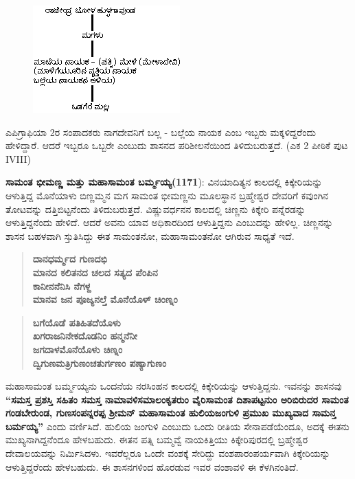 \begin{figure}[H]
\includegraphics[scale=.75]{images/chap3/chap3fig4.2.jpeg}
\end{figure}

ಎಪಿಗ್ರಾಫಿಯಾ 2ರ ಸಂಪಾದಕರು ನಾಗದೇವನಿಗೆ ಬಲ್ಲ - ಬಲ್ಲೆಯ ನಾಯಕ ಎಂಬ ಇಬ್ಬರು ಮಕ್ಕಳಿದ್ದರೆಂದು ಹೇಳಿದ್ದಾರೆ. ಆದರೆ ಇಬ್ಬರೂ ಒಬ್ಬರೇ ಎಂಬುದು ಶಾಸನದ ಪರಿಶೀಲನೆಯಿಂದ ತಿಳಿದುಬರುತ್ತದೆ. (ಎಕ 2 ಪೀಠಿಕೆ ಪುಟ IVIII)

\textbf{ಸಾಮಂತ ಭೀಮಣ್ಣ ಮತ್ತು ಮಹಾಸಾಮಂತ ಬರ್ಮ್ಮಯ್ಯ(1171}): ವಿನಯಾದಿತ್ಯನ ಕಾಲದಲ್ಲಿ ಕಿಕ್ಕೇರಿಯನ್ನು ಆಳುತ್ತಿದ್ದ ಮೊನೆಯಾಳು ಬಿಣ್ಣಮ್ಮನ ಮಗ ಸಾಮಂತ ಭೀಮಣ್ಣನು ಮೂಲಸ್ಥಾನ ಬ್ರಹ್ಮೇಶ್ವರ ದೇವರಿಗೆ ಕವುಂಗಿನ ತೋಟವನ್ನು ದತ್ತಿಬಿಟ್ಟನೆಂದು ತಿಳಿದುಬರುತ್ತದೆ. ವಿಷ್ಣುವರ್ಧನನ ಕಾಲದಲ್ಲಿ ಚಿಣ್ಣನು ಕಿಕ್ಕೇರಿ ಪನ್ನೆರಡನ್ನು ಆಳುತ್ತಿದ್ದನೆಂದು ಹೇಳಿದೆ. ಆದರೆ ಅವನು ಯಾವ ಅಧಿಕಾರದಿಂದ ಆಳುತ್ತಿದ್ದನು ಎಂಬುದನ್ನು ಹೇಳಿಲ್ಲ. ಚಿಣ್ಣನನ್ನು ಶಾಸನ ಬಹಳವಾಗಿ ಸ್ತುತಿಸಿದ್ದು ಈತ ಸಾಮಂತನೋ, ಮಹಾಸಾಮಂತನೋ ಆಗಿರುವ ಸಾಧ್ಯತೆ ಇದೆ.

\begin{verse}
\textbf{ದಾನಧರ್ಮ್ಮದ ಗುಣದಭಿ} \\\textbf{ಮಾನದ ಕಲಿತನದ ಚಲದ ಸತ್ಯದ ಪೆಂಪಿನ} \\\textbf{ಕಾನೀನನೆನಿಸಿ ನೆಗಳ್ದ} \\\textbf{ಮಾನವ ಜನ ಪೂಜ್ಯನಲ್ತೆ ಮೊನೆಯೊಳ್​ ಚಿಂಣ್ನಂ}
\end{verse}

\begin{verse}
\textbf{ಬಗೆಯೊಡೆ ಪತಿಹಿತದೆಯೊಳು} \\\textbf{ಖಗರಾಜನಿನೇಕದೊಡನಿಂ ಹನ್ಮನೆನೀ} \\\textbf{ಜಗದಾಳಮೊನೆಯೊಳು ಚಿಣ್ನಂ} \\\textbf{ದ್ವಿಗುಣಮತ್ರಿಗುಣಂಚತುರ್ಗಣಂ ಪಣ್ಯಾಗುಣಂ}
\end{verse}

ಮಹಾಸಾಮಂತ ಬರ್ಮ್ಮಯ್ಯನು ಒಂದನೆಯ ನರಸಿಂಹನ ಕಾಲದಲ್ಲಿ ಕಿಕ್ಕೇರಿಯನ್ನು ಆಳುತ್ತಿದ್ದನು. ಇವನನ್ನು ಶಾಸನವು \textbf{“ಸಮಸ್ತ ಪ್ರಶಸ್ತಿ ಸಹಿತಂ ಸಮಸ್ತ ನಾಮಾವಳಿಸಮಾಲಂಕೃತರುಂ ವೈರಿಸಾಮಂತ ದಿಶಾಪಟ್ಟನುಂ ಅರಿಬಿರುದರ ಸಾಮಂತ ಗಂಡಬೇರುಂಡ, ಗುಣಸಂಪನ್ನರಪ್ಪ ಶ‍್ರೀಮನ್​ ಮಹಾಸಾಮಂತ ಹುಲಿಯಜಂಗುಳಿ ಪ್ರಮುಖ ಮುಖ್ಯವಾದ ಸಾಮನ್ತ ಬರ್ಮಯ್ಯ” }ಎಂದು ವರ್ಣಿಸಿದೆ. ಹುಲಿಯ ಜಂಗುಳಿ ಎಂಬುದು ಒಂದು ರೀತಿಯ ಸೇನಾಪಡೆಯೆಂದೂ, ಅದಕ್ಕೆ ಈತನು ಮುಖ್ಯನಾಗಿದ್ದನೆಂದೂ ಹೇಳಬಹುದು. ಈತನ ಪತ್ನಿ ಬಮ್ಮವ್ವೆ ನಾಯಕಿತ್ತಿಯು ಕಿಕ್ಕೇರಿಪುರದಲ್ಲಿ ಬ್ರಹ್ಮೇಶ್ವರ ದೇವಾಲಯವನ್ನು ನಿರ್ಮಿಸಿದಳು. ಇವರೆಲ್ಲರೂ ಒಂದೇ ವಂಶಕ್ಕೆ ಸೇರಿದ್ದು ವಂಶಪಾರಂಪರ್ಯವಾಗಿ ಕಿಕ್ಕೇರಿಯನ್ನು ಆಳುತ್ತಿದ್ದರೆಂದು ಹೇಳಬಹುದು. ಈ ಶಾಸನಗಳಿಂದ ಹೊರಡುವ ಇವರ ವಂಶಾವಳಿ ಈ ಕೆಳಗಿನಂತಿದೆ.

